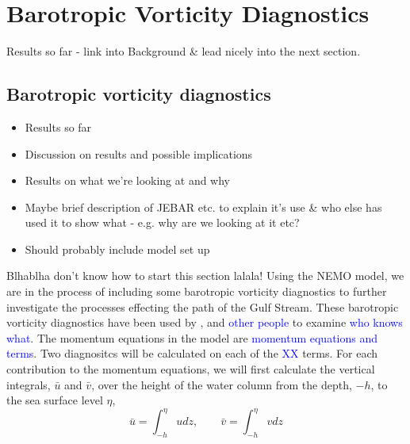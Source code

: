 \documentclass[a4paper,11pt]{article}
\newcommand\td[1]{\textcolor{blue}{#1}}
\begin{document}
\section{Barotropic Vorticity Diagnostics}

Results so far - link into Background \& lead nicely into the next section.
\subsection{Barotropic vorticity diagnostics}
\begin{itemize}
  \item Results so far
  \item Discussion on results and possible implications
  \item Results on what we're looking at and why
  \item Maybe brief description of JEBAR etc. to explain it's use \& who else has used it to show what - e.g. why are we looking at it etc?
  \item Should probably include model set up
\end{itemize}

Blhablha don't know how to start this section lalala!
Using the NEMO model, we are in the process of including some barotropic vorticity diagnostics to further investigate the processes effecting the path of the Gulf Stream. These barotropic vorticity diagnostics have been used by \citep{Bell1991},\citep{Gula???} and \td{other people} to examine \td{who knows what}. The momentum equations in the model are \td{momentum equations and terms}. Two diagnositcs will be calculated on each of the \td{XX} terms.
For each contribution to the momentum equations, we will first calculate the vertical integrals, $\bar{u}$ and $\bar{v}$, over the height of the water column from the depth, $-h$, to the sea surface level $\eta$,
\begin{equation}
	\bar{u} = \int_{-h}^{\eta} u dz ,\qquad \bar{v} = \int_{-h}^{\eta} v dz 
\end {equation}
\end{document}
